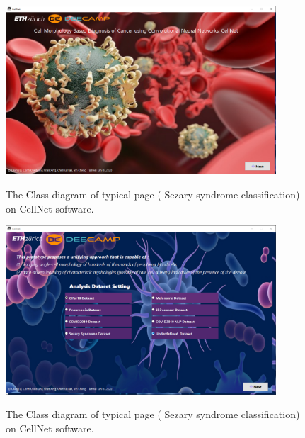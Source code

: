 \begin{figure}[t]
\begin{center}
\includegraphics[height=0.3\textheight,width=0.9\textwidth]{thesis-template-master/images/cellnet1page.PNG}
\label{fig:cellnet}
\end{center}
\caption{ The Class diagram of typical page ( Sezary syndrome classification) on CellNet software.}
\end{figure}


\begin{figure}[t]
\begin{center}
\includegraphics[height=0.3\textheight,width=0.9\textwidth]{thesis-template-master/images/cellnet2page.PNG}
\label{fig:cellnet}
\end{center}
\caption{ The Class diagram of typical page ( Sezary syndrome classification) on CellNet software.}
\end{figure}


